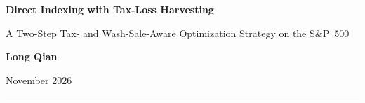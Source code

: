 \documentclass[11pt,letterpaper]{article}
\begin{document}
\thispagestyle{firstpage}
\setlength{\abovedisplayskip}{6pt}
\setlength{\belowdisplayskip}{6pt}
\setlength{\abovedisplayshortskip}{3pt}
\setlength{\belowdisplayshortskip}{4pt}

\begingroup\sffamily
{\LARGE\bfseries Direct Indexing with Tax-Loss Harvesting\par}
\vspace{5pt}
{\large\color{slate}A Two-Step Tax- and Wash-Sale-Aware Optimization Strategy on the S\&P~500\par}
\vspace{10pt}
{\normalsize\bfseries Long Qian\par}
\vspace{1pt}
{\small\color{slate}November 2026\par}
\endgroup
\vspace{6pt}
{\color{black}\rule{\linewidth}{0.8pt}}
\vspace{4pt}







\end{document}
